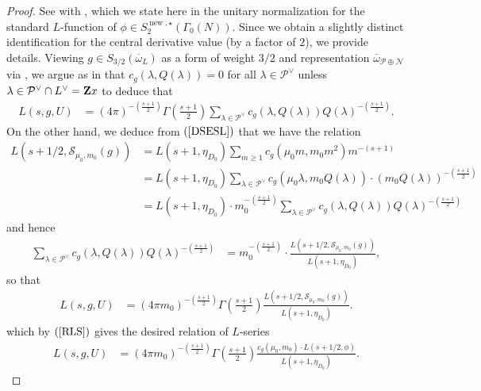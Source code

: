 \documentclass{amsart}
\theoremstyle{definition}
\theoremstyle{definition}
\theoremstyle{definition}
\begin{document}
\begin{proof} 

See \cite[Lemma 7.3]{BY} with \cite[(4.24)]{BY}, which we state here in the unitary normalization for the standard $L$-function of $\phi \in S_2^{\operatorname{new}, \star}(\Gamma_0(N))$. 
Since we obtain a slightly distinct identification for the central derivative value (by a factor of $2$), we provide details. 
Viewing $g \in S_{3/2}(\overline{\omega}_L)$ as a form of weight $3/2$ and representation $\overline{\omega}_{\mathcal{P} \oplus \mathcal{N}}$ 
via \cite[Lemma 3.1]{BY}, we argue as in \cite[Lemma 7.3]{BY} that $c_g(\lambda, Q(\lambda)) = 0$ for all $\lambda \in \mathcal{P}^{\vee}$ 
unless $\lambda \in \mathcal{P}^{\vee} \cap L^{\vee} = {\bf{Z}} x$ to deduce that 
\begin{align*} L(s, g, U) &= (4 \pi)^{- \left( \frac{s+1}{2} \right)} \Gamma \left( \frac{s+1}{2} \right) 
\sum\limits_{\lambda \in \mathcal{P}^{\vee}} c_g(\lambda, Q(\lambda)) Q(\lambda)^{- \left( \frac{s+1}{2} \right)}.\end{align*}
On the other hand, we deduce from $(\ref{DSESL})$ that we have the relation
\begin{equation*}\begin{aligned} L(s +1/2, \mathcal{S}_{\mu_0, m_0}(g)) 
&= L(s +1, \eta_{D_0}) \sum\limits_{m \geq 1} c_g( \mu_0 m, m_0 m^2) m^{-(s+1)} \\
&=L(s+1, \eta_{D_0})  \sum\limits_{\lambda \in \mathcal{P}^{\vee}} c_g(\mu_0 \lambda, m_0 Q(\lambda)) \cdot \left( m_0 Q(\lambda) \right)^{- \left( \frac{s+1}{2} \right)} \\
&= L(s+1, \eta_{D_0}) \cdot m_0^{- \left( \frac{s+1}{2} \right)}  
\sum\limits_{\lambda \in \mathcal{P}^{\vee}} c_g(\lambda, Q(\lambda)) Q(\lambda)^{- \left( \frac{s+1}{2} \right)}\end{aligned}\end{equation*}
and hence 
\begin{align*} \sum\limits_{\lambda \in \mathcal{P}^{\vee}} c_g(\lambda, Q(\lambda)) Q(\lambda)^{- \left( \frac{s+1}{2} \right)} 
&=m_0^{- \left( \frac{s+1}{2} \right)}  \cdot \frac{L(s +1/2, \mathcal{S}_{\mu_0, m_0}(g))}{ L(s+1, \eta_{D_0}) },\end{align*}
so that 
\begin{align*} L(s, g, U) &= (4 \pi m_0)^{- \left( \frac{s+1}{2} \right)} \Gamma \left( \frac{s+1}{2} \right) 
\frac{L(s +1/2, \mathcal{S}_{\mu_0, m_0}(g))}{ L(s+1, \eta_{D_0}) }. \end{align*}
which by $(\ref{RLS})$ gives the desired relation of $L$-series
\begin{align*} L(s, g, U) &= (4 \pi m_0)^{- \left( \frac{s+1}{2} \right)} \Gamma \left( \frac{s+1}{2} \right) 
\frac{ c_g(\mu_0, m_0) \cdot L(s+1/2, \phi) }{ L(s+1, \eta_{D_0}) }. \end{align*}


\end{proof}
\end{document}
